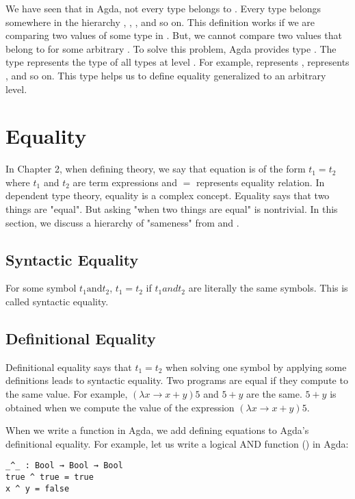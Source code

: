 We have seen that in Agda, not every type belongs to . Every
type belongs somewhere in the hierarchy , ,
, and so on. This definition works if we are comparing two values
of some type in . But, we cannot compare two values that belong to
 for some arbitrary . To solve this problem, Agda
provides type . The type  represents the type of all
types at level . For example,  represents ,
 represents , and so on. This type helps us to define
equality generalized to an arbitrary level.

\section{Equality}
\label{equality}
In Chapter 2, when defining theory, we say that equation is of the form $t_1 =
t_2$ where $t_1$ and $t_2$ are term expressions and $=$ represents equality
relation. In dependent type theory, equality is a complex concept. Equality says
that two things are "equal". But asking "when two things are equal" is
nontrivial. In this section, we discuss a hierarchy of "sameness" from
\cite{bocquet2020coherence} and \cite{eremondi2022propositional}.

\subsection{Syntactic Equality}
For some symbol $t_1 \text{and} t_2$, $t_1 = t_2$ if $t_1 and t_2$ are literally
the same symbols. This is called syntactic equality.

\subsection{Definitional Equality}
Definitional equality says that $t_1 = t_2$ when solving one symbol by applying
some definitions leads to syntactic equality. Two programs are equal if they
compute to the same value. For example, $(\lambda x \rightarrow x + y) 5$ and $5
+ y$ are the same. $5 + y$ is obtained when we compute the value of the
expression $ (\lambda x \rightarrow x + y) 5$.

When we write a function in Agda, we add defining equations to Agda's
definitional equality. For example, let us write a logical AND function
(\inline{_^_}) in Agda:

\begin{verbatim}
_^_ : Bool → Bool → Bool
true ^ true = true
x ^ y = false
\end{verbatim}

